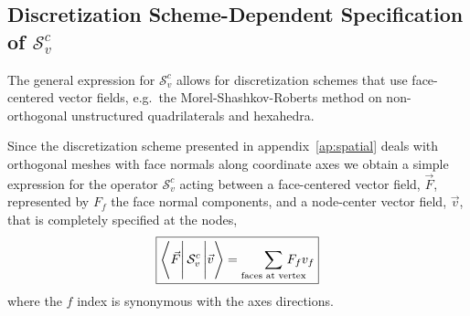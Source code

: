 \documentclass[12pt]{article}
\newcommand{\bracket}[3]{%
  \ensuremath{%
       \left\langle {#1} \rule{0mm}{4ex} \right|%
       {#2} \left| {#3}  \rule{0mm}{4ex} \right\rangle%
  }%
}
\begin{document}
\subsection{Discretization Scheme-Dependent
            Specification of $\mathcal{S}^{c}_{v}$}

The general expression for $\mathcal{S}^{c}_{v}$ allows for discretization
schemes that use face-centered vector fields, e.g.\ the Morel-Shashkov-Roberts
method\cite{MorelShashkov}
 on non-orthogonal unstructured quadrilaterals and hexahedra.

Since the discretization scheme presented in appendix~\ref{ap:spatial} deals
with orthogonal meshes with face normals along coordinate axes we obtain
a simple expression for the operator $\mathcal{S}^{c}_{v}$ acting between
a face-centered vector field, $\vec{F}$, represented by $F_{f}$ the face normal
components, and a node-center vector field, $\vec{v}$, that is completely
specified at the nodes,
\begin{equation}
 \boxed{
   \bracket{\vec{F}}{\mathcal{S}^{c}_{v}}{\vec{v}} =
       \sum_{\text{faces at vertex}} \!\!\!\!\!\!\!\!\!\! F_{f} v_{f}
 }
\end{equation}
where the $f$ index is synonymous with the axes directions.



\end{document}
